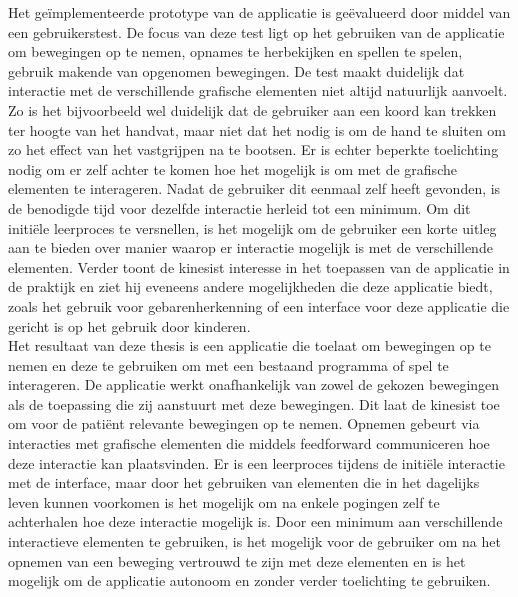 Het ge\"implementeerde prototype van de applicatie is ge\"evalueerd door middel van een gebruikerstest. De focus van deze test ligt op het gebruiken van de applicatie om bewegingen op te nemen, opnames te herbekijken en spellen te spelen, gebruik makende van opgenomen bewegingen. De test maakt duidelijk dat interactie met de verschillende grafische elementen niet altijd natuurlijk aanvoelt. Zo is het bijvoorbeeld wel duidelijk dat de gebruiker aan een koord kan trekken ter hoogte van het handvat, maar niet dat het nodig is om de hand te sluiten om zo het effect van het vastgrijpen na te bootsen. Er is echter beperkte toelichting nodig om er zelf achter te komen hoe het mogelijk is om met de grafische elementen te interageren. Nadat de gebruiker dit eenmaal zelf heeft gevonden, is de benodigde tijd voor dezelfde interactie herleid tot een minimum. Om dit initi\"ele leerproces te versnellen, is het mogelijk om de gebruiker een korte uitleg aan te bieden over manier waarop er interactie mogelijk is met de verschillende elementen. Verder toont de kinesist interesse in het toepassen van de applicatie in de praktijk en ziet hij eveneens andere mogelijkheden die deze applicatie biedt, zoals het gebruik voor gebarenherkenning of een interface voor deze applicatie die gericht is op het gebruik door kinderen.\\

Het resultaat van deze thesis is een applicatie die toelaat om bewegingen op te nemen en deze te gebruiken om met een bestaand programma of spel te interageren. De applicatie werkt onafhankelijk van zowel de gekozen bewegingen als de toepassing die zij aanstuurt met deze bewegingen. Dit laat de kinesist toe om voor de pati\"ent relevante bewegingen op te nemen. Opnemen gebeurt via interacties met grafische elementen die middels feedforward communiceren hoe deze interactie kan plaatsvinden. Er is een leerproces tijdens de initi\"ele interactie met de interface, maar door het gebruiken van elementen die in het dagelijks leven kunnen voorkomen is het mogelijk om na enkele pogingen zelf te achterhalen hoe deze interactie mogelijk is. Door een minimum aan verschillende interactieve elementen te gebruiken, is het mogelijk voor de gebruiker om na het opnemen van een beweging vertrouwd te zijn met deze elementen en is het mogelijk om de applicatie autonoom en zonder verder toelichting te gebruiken.

